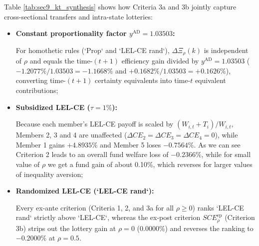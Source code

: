 \documentclass[11pt,a4paper]{article}
\theoremstyle{definition}
\theoremstyle{plain}
\theoremstyle{remark}
\newcommand{\1}{\mathbf{1}}
\begin{document}
Table \ref{tab:sec9_kt_synthesis} shows how Criteria 3a and 3b jointly capture cross-sectional transfers and intra-state lotteries:
\begin{itemize}
    \item \textbf{Constant proportionality factor $y^{\text{AD}} = 1.03503$:}
    
    For homothetic rules (`Prop` and `LEL-CE rand`), $\Delta \Xi_\rho(k)$ is independent of $\rho$ and equals the time-$(t+1)$ efficiency gain divided by $y^{\text{AD}} = 1.03503$ ($-1.2077\% / 1.03503 = -1.1668\%$ and $+0.1682\% / 1.03503 = +0.1626\%$), converting time-$(t+1)$ certainty equivalents into time-$t$ equivalent contributions;
    \item \textbf{Subsidized LEL-CE ($\tau = 1\%$):} 
    
    Because each member's LEL-CE payoff is scaled by $(W_{i,t} + T_i)/W_{i,t}$, Members 2, 3 and 4 are unaffected ($\Delta CE_2 = \Delta CE_3 = \Delta CE_4 = 0$), while Member 1 gains $+4.8935\%$ and Member 5 loses $-0.7564\%$. As we can see Criterion 2 leads to an overall fund welfare loss of $-0.2366\%$, while for small value of $\rho$ we get a fund gain of about 0.10\%, which reverses for larger values of inequality aversion;
    \item \textbf{Randomized LEL-CE (`LEL-CE rand`):} 
    
    Every ex-ante criterion (Criteria 1, 2, and 3a for all $\rho \ge 0$) ranks `LEL-CE rand` strictly above `LEL-CE`, whereas the ex-post criterion $SCE_\rho^{\text{ep}}$ (Criterion 3b) strips out the lottery gain at $\rho = 0$ ($0.0000\%$) and reverses the ranking to $-0.2000\%$ at $\rho = 0.5$.
\end{itemize}
\end{document}
